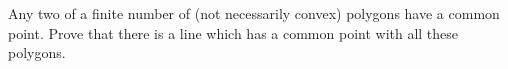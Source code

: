 Any two of a finite number of (not necessarily convex) polygons have a common point. Prove that there is a line which has a common point with all these polygons.
